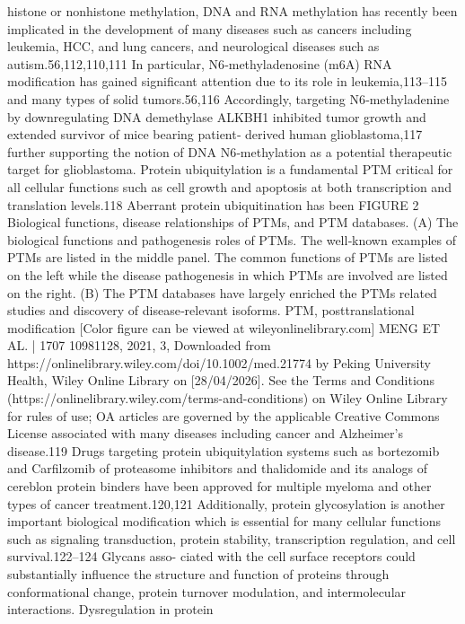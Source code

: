 histone or nonhistone methylation, DNA and RNA methylation has recently been implicated in the development of
many diseases such as cancers including leukemia, HCC, and lung cancers, and neurological diseases such as
autism.56,112,110,111 In particular, N6‐methyladenosine (m6A) RNA modification has gained significant attention due
to its role in leukemia,113–115 and many types of solid tumors.56,116 Accordingly, targeting N6‐methyladenine by
downregulating DNA demethylase ALKBH1 inhibited tumor growth and extended survivor of mice bearing patient‐
derived human glioblastoma,117 further supporting the notion of DNA N6‐methylation as a potential therapeutic
target for glioblastoma. Protein ubiquitylation is a fundamental PTM critical for all cellular functions such as cell
growth and apoptosis at both transcription and translation levels.118 Aberrant protein ubiquitination has been
FIGURE 2
Biological functions, disease relationships of PTMs, and PTM databases. (A) The biological functions
and pathogenesis roles of PTMs. The well‐known examples of PTMs are listed in the middle panel. The common
functions of PTMs are listed on the left while the disease pathogenesis in which PTMs are involved are listed on
the right. (B) The PTM databases have largely enriched the PTMs related studies and discovery of disease‐relevant
isoforms. PTM, posttranslational modification [Color figure can be viewed at wileyonlinelibrary.com]
MENG ET AL.
| 1707
 10981128, 2021, 3, Downloaded from https://onlinelibrary.wiley.com/doi/10.1002/med.21774 by Peking University Health, Wiley Online Library on [28/04/2026]. See the Terms and Conditions (https://onlinelibrary.wiley.com/terms-and-conditions) on Wiley Online Library for rules of use; OA articles are governed by the applicable Creative Commons License
associated with many diseases including cancer and Alzheimer's disease.119 Drugs targeting protein ubiquitylation
systems such as bortezomib and Carfilzomib of proteasome inhibitors and thalidomide and its analogs of cereblon
protein binders have been approved for multiple myeloma and other types of cancer treatment.120,121 Additionally,
protein glycosylation is another important biological modification which is essential for many cellular functions
such as signaling transduction, protein stability, transcription regulation, and cell survival.122–124 Glycans asso-
ciated with the cell surface receptors could substantially influence the structure and function of proteins through
conformational change, protein turnover modulation, and intermolecular interactions. Dysregulation in protein
